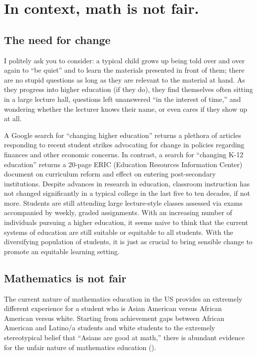 \chapter{In context, math is not fair.}

\section{The need for change}
I politely ask you to consider: a typical child grows up being told over and over again to ``be quiet'' and to learn the materials presented in front of them; there are no stupid questions as long as they are relevant to the material at hand. As they progress into higher education (if they do), they find themselves often sitting in a large lecture hall, questions left unanswered ``in the interest of time,'' and wondering whether the lecturer knows their name, or even cares if they show up at all.

A Google search for ``changing higher education'' returns a plethora of articles responding to recent student strikes advocating for change in policies regarding finances and other economic concerns. In contrast, a search for ``changing K-12 education'' returns a 20-page ERIC (Education Resources Information Center) document on curriculum reform and effect on entering post-secondary institutions. Despite advances in research in education, classroom instruction has not changed significantly in a typical college in the last five to ten decades, if not more. Students are still attending large lecture-style classes assessed via exams accompanied by weekly, graded assignments. With an increasing number of individuals pursuing a higher education, it seems naive to think that the current systems of education are still suitable or equitable to all students. With the diversifying population of students, it is just as crucial to bring sensible change to promote an equitable learning setting.

\section{Mathematics is not fair}
The current nature of mathematics education in the US provides an extremely different experience for a student who is Asian American versus African American versus white. Starting from achievement gaps between African American and Latino/a students and white students to  the extremely stereotypical belief that ``Asians are good at math,'' there is abundant evidence for the unfair nature of mathematics education (\cite{alfinio_flores_examining_2007}).

